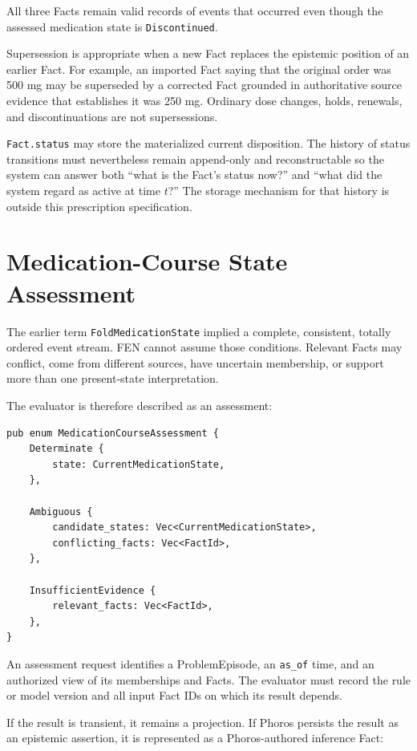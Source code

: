 \documentclass[11pt]{article}
\newcommand{\field}[1]{\texttt{#1}}
\begin{document}
All three Facts remain valid records of events that occurred even though the
assessed medication state is \field{Discontinued}.

Supersession is appropriate when a new Fact replaces the epistemic position
of an earlier Fact. For example, an imported Fact saying that the original
order was 500 mg may be superseded by a corrected Fact grounded in
authoritative source evidence that establishes it was 250 mg. Ordinary dose
changes, holds, renewals, and
discontinuations are not supersessions.

\field{Fact.status} may store the materialized current disposition. The
history of status transitions must nevertheless remain append-only and
reconstructable so the system can answer both ``what is the Fact's status
now?'' and ``what did the system regard as active at time $t$?'' The storage
mechanism for that history is outside this prescription specification.

\section{Medication-Course State Assessment}
\label{sec:state-assessment}

The earlier term \field{FoldMedicationState} implied a complete, consistent,
totally ordered event stream. FEN cannot assume those conditions. Relevant
Facts may conflict, come from different sources, have uncertain membership,
or support more than one present-state interpretation.

The evaluator is therefore described as an assessment:

\begin{lstlisting}
pub enum MedicationCourseAssessment {
    Determinate {
        state: CurrentMedicationState,
    },

    Ambiguous {
        candidate_states: Vec<CurrentMedicationState>,
        conflicting_facts: Vec<FactId>,
    },

    InsufficientEvidence {
        relevant_facts: Vec<FactId>,
    },
}
\end{lstlisting}

An assessment request identifies a ProblemEpisode, an \field{as\_of} time,
and an authorized view of its memberships and Facts. The evaluator must
record the rule or model version and all input Fact IDs on which its result
depends.

If the result is transient, it remains a projection. If Phoros persists the
result as an epistemic assertion, it is represented as a Phoros-authored
inference Fact:
\end{document}
